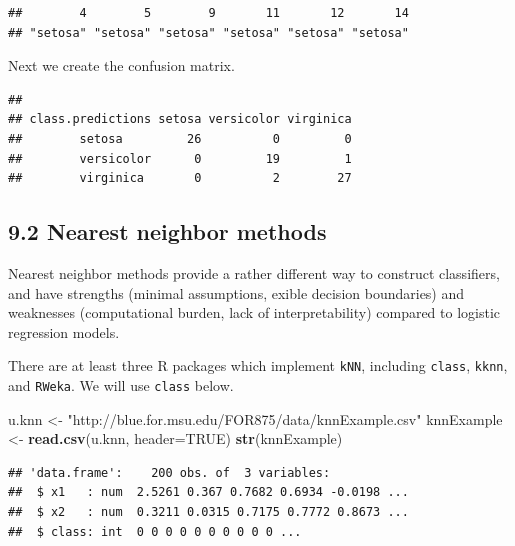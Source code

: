 \documentclass[]{article}
\newenvironment{Shaded}{\begin{snugshade}}{\end{snugshade}}
\newcommand{\KeywordTok}[1]{\textcolor[rgb]{0.13,0.29,0.53}{\textbf{#1}}}
\newcommand{\DataTypeTok}[1]{\textcolor[rgb]{0.13,0.29,0.53}{#1}}
\newcommand{\StringTok}[1]{\textcolor[rgb]{0.31,0.60,0.02}{#1}}
\newcommand{\OtherTok}[1]{\textcolor[rgb]{0.56,0.35,0.01}{#1}}
\newcommand{\OperatorTok}[1]{\textcolor[rgb]{0.81,0.36,0.00}{\textbf{#1}}}
\newcommand{\NormalTok}[1]{#1}
\begin{document}
\begin{verbatim}
##        4        5        9       11       12       14 
## "setosa" "setosa" "setosa" "setosa" "setosa" "setosa"
\end{verbatim}

Next we create the confusion matrix.

\begin{Shaded}
\end{Shaded}

\begin{verbatim}
##                  
## class.predictions setosa versicolor virginica
##        setosa         26          0         0
##        versicolor      0         19         1
##        virginica       0          2        27
\end{verbatim}

\subsection{9.2 Nearest neighbor
methods}\label{nearest-neighbor-methods}

Nearest neighbor methods provide a rather different way to construct
classifiers, and have strengths (minimal assumptions, exible decision
boundaries) and weaknesses (computational burden, lack of
interpretability) compared to logistic regression models.

There are at least three R packages which implement \texttt{kNN},
including \texttt{class}, \texttt{kknn}, and \texttt{RWeka}. We will use
\texttt{class} below.

\begin{Shaded}
\begin{Highlighting}[]
\NormalTok{u.knn <-}\StringTok{ "http://blue.for.msu.edu/FOR875/data/knnExample.csv"}
\NormalTok{knnExample <-}\StringTok{ }\KeywordTok{read.csv}\NormalTok{(u.knn, }\DataTypeTok{header=}\OtherTok{TRUE}\NormalTok{)}
\KeywordTok{str}\NormalTok{(knnExample)}
\end{Highlighting}
\end{Shaded}

\begin{verbatim}
## 'data.frame':    200 obs. of  3 variables:
##  $ x1   : num  2.5261 0.367 0.7682 0.6934 -0.0198 ...
##  $ x2   : num  0.3211 0.0315 0.7175 0.7772 0.8673 ...
##  $ class: int  0 0 0 0 0 0 0 0 0 0 ...
\end{verbatim}
\end{document}
